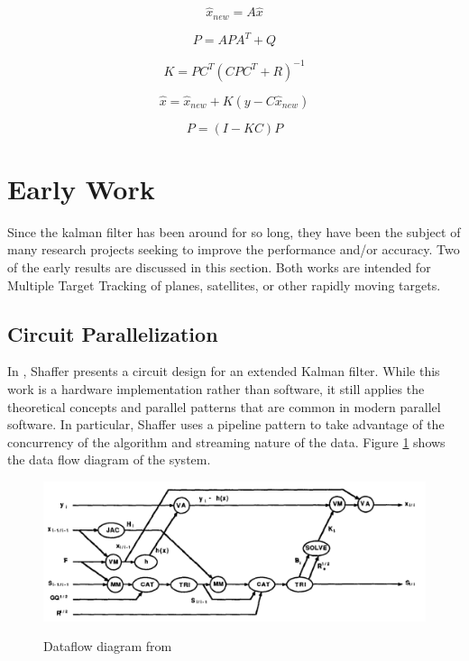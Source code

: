 \documentclass[11pt]{article}
\begin{document}
\begin{equation}
\hat{x}_{new} = A\hat{x}
\end{equation}

\begin{equation}
P=APA^T+Q
\end{equation}

\begin{equation}
K = PC^T(CPC^T+R)^{-1}
\end{equation}

\begin{equation}
\hat{x}=\hat{x}_{new} + K(y-C\hat{x}_{new})
\end{equation}

\begin{equation}
P=(I-KC)P
\end{equation}

\section{Early Work}
Since the kalman filter has been around for so long, they have been the subject of many research projects seeking to improve the performance and/or accuracy. Two of the early results are discussed in this section. Both works are intended for Multiple Target Tracking of planes, satellites, or other rapidly moving targets.

\subsection{Circuit Parallelization}
In \cite{Shaffer:1987:IPE:42040.42101}, Shaffer presents a circuit design for an extended Kalman filter. While this work is a hardware implementation rather than software, it still applies the theoretical concepts and parallel patterns that are common in modern parallel software. In particular, Shaffer uses a pipeline pattern to take advantage of the concurrency of the algorithm and streaming nature of the data. Figure \ref{fig:shaffer} shows the data flow diagram of the system.

\begin{figure}
\includegraphics[width=\textwidth]{shaffer.png}
\label{fig:shaffer}
\caption{Dataflow diagram from \cite{Shaffer:1987:IPE:42040.42101}}
\end{figure}
\end{document}

